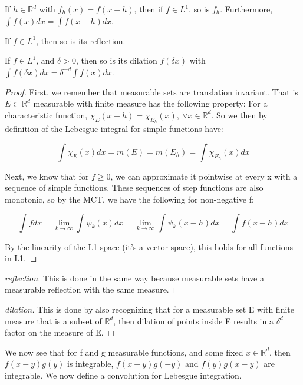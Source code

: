 \documentclass[class=article, crop=false]{standalone}
\begin{document}
			\begin{lemma} 
				If $h \in \mathbb{R}^d$ with $f_h(x) = f(x-h)$, then if $f \in L^1$, so is $f_h$. Furthermore, $\int f(x) dx = \int f(x-h) dx$.

				If $f \in L^1$, then so is its reflection.

				If $f \in L^1$, and $\delta > 0$, then so is its dilation $f(\delta x)$ with $\int f(\delta x) dx = \delta^{-d} \int f(x) dx$.
			\end{lemma}
			\begin{proof}
				First, we remember that measurable sets are translation invariant. That is $E \subset \mathbb{R}^d$ measurable with finite measure has the following property: For a characteristic function, $\chi_E(x-h) = \chi_{E_h}(x), \  \forall x \in \mathbb{R}^d$. So we then by definition of the Lebesgue integral for simple functions have:

					$$\int \chi_E(x)dx = m(E) = m(E_h) = \int \chi_{E_h}(x) dx$$

				Next, we know that for $f \ge 0$, we can approximate it pointwise at every x with a sequence of simple functions. These sequences of step functions are also monotonic, so by the MCT, we have the following for non-negative f:

					$$\int f dx = \lim_{k \rightarrow \infty} \int \psi_k(x) dx = \lim_{k \rightarrow \infty} \int \psi_k (x-h) dx = \int f(x-h)dx$$

				By the linearity of the L1 space (it's a vector space), this holds for all functions in L1.
			\end{proof}
			\begin{proof} [reflection]
				This is done in the same way because measurable sets have a measurable reflection with the same measure.
			\end{proof}
			\begin{proof} [dilation]
				This is done by also recognizing that for a measurable set E with finite measure that is a subset of $\mathbb{R}^d$, then dilation of points inside E results in a $\delta ^d$ factor on the measure of E.
			\end{proof}

			We now see that for f and g measurable functions, and some fixed $x \in \mathbb{R}^d$, then $f(x-y)g(y)$ is integrable, $f(x+y)g(-y)$ and $f(y)g(x-y)$ are integrable. We now define a convolution for Lebesgue integration.
\end{document}
